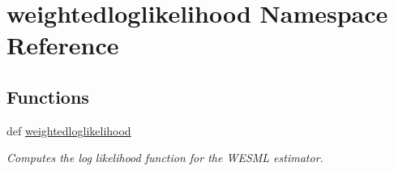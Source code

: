 \hypertarget{namespaceweightedloglikelihood}{\section{weightedloglikelihood Namespace Reference}
\label{namespaceweightedloglikelihood}
}
\subsection*{Functions}
\begin{DoxyCompactItemize}
\item 
def \hyperlink{group__biogeme_ga699531bc64b4cecc340c6f4546da92bc}{weightedloglikelihood}
\begin{DoxyCompactList}\small\item\em Computes the log likelihood function for the W\+E\+S\+M\+L estimator. \end{DoxyCompactList}\end{DoxyCompactItemize}
